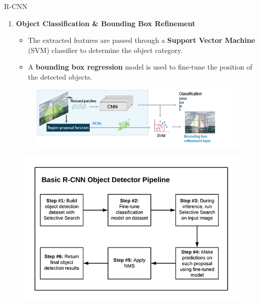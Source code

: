 \begin{frame}[allowframebreaks]{R-CNN}
\begin{enumerate}
\begin{figure}
            \end{figure}
\framebreak
            \item \textbf{Object Classification \& Bounding Box Refinement}
            \begin{itemize}
                \item The extracted features are passed through a \textbf{Support Vector Machine} (SVM) classifier to determine the object category.
                \item A \textbf{bounding box regression} model is used to fine-tune the position of the detected objects.
            \end{itemize}
            \begin{figure}
                \centering
                \includegraphics[width=1.0\textwidth,height=0.4\textheight,keepaspectratio]{images/object-detect/r-cnn-region-proposal.png}
            \end{figure}
        \end{enumerate}

\framebreak

        \begin{figure}
            \centering
            \includegraphics[width=1.0\textwidth,height=0.9\textheight,keepaspectratio]{images/object-detect/r-cnn-pipeline.png}
        \end{figure}
\end{frame}

